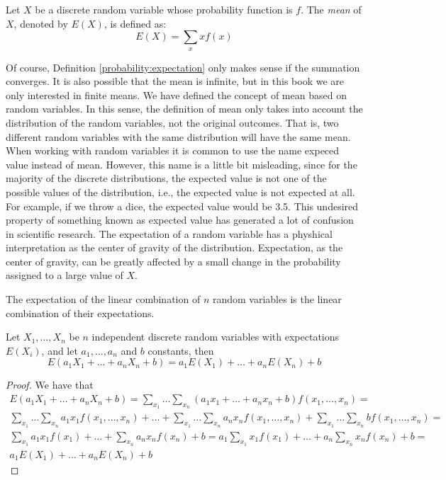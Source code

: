 \begin{definition}\label{probability:expectation}
Let $X$ be a discrete random variable whose probability function is $f$. The \emph{mean} of $X$, denoted by $E\left(X\right)$, is defined as:
\[
E\left(X\right)=\sum_{x}xf\left(x\right)
\]
\end{definition}

Of course, Definition \ref{probability:expectation} only makes sense if the summation converges. It is also possible that the mean is infinite, but in this book we are only interested in finite means. We have defined the concept of mean based on random variables. In this sense, the definition of mean only takes into account the distribution of the random variables, not the original outcomes. That is, two different random variables with the same distribution will have the same mean. When working with random variables it is common to use the name expeced value instead of mean. However, this name is a little bit misleading, since for the majority of the discrete distributions, the expected value is not one of the possible values of the distribution, i.e., the expected value is not expected at all. For example, if we throw a dice, the expected value would be 3.5. This undesired property of something known as expected value has generated a lot of confusion in scientific research. The expectation of a random variable has a physhical interpretation as the center of gravity of the distribution. Expectation, as the center of gravity, can be greatly affected by a small change in the probability assigned to a large value of $X$.

The expectation of the linear combination of $n$ random variables is the linear combination of their expectations.

\begin{proposition}
Let $X_{1}, \ldots, X_{n}$ be $n$ independent discrete random variables with expectations $E\left(X_{i}\right)$, and let $a_1, \ldots, a_n$ and $b$ constants, then
\[
E\left(a_{1}X_{1}+\ldots+a_{n}X_{n}+b\right)=a_{1}E\left(X_{1}\right)+\ldots+a_{n}E\left(X_{n}\right)+b
\]
\end{proposition}
\begin{proof}
We have that
\begin{multline}
E \left(a_1 X_1 + \ldots + a_n X_n +b \right) = 
\sum_{x_1} \ldots \sum_{x_n} \left(a_ 1 x_1 + \ldots + a_n x_n + b  \right) f\left(x_1, \ldots, x_n \right) = \\
\sum_{x_1} \ldots \sum_{x_n} a_1 x_1 f\left(x_1, \ldots, x_n \right) + \ldots + \sum_{x_1} \ldots \sum_{x_n} a_n x_n f\left(x_1, \ldots, x_n \right) + \sum_{x_1} \ldots \sum_{x_n} b f\left(x_1, \ldots, x_n \right) = \\
\sum_{x_1} a_1 x_1 f\left(x_1\right) + \ldots + \sum_{x_n} a_n x_n f\left( x_n \right) + b = 
a_1 \sum_{x_1} x_1 f\left(x_1\right) + \ldots + a_n \sum_{x_n} x_n f\left( x_n \right) + b = \\
a_1 E\left(X_1\right) + \ldots + a_n E\left(X_n\right) + b
\end{multline}
\end{proof}

